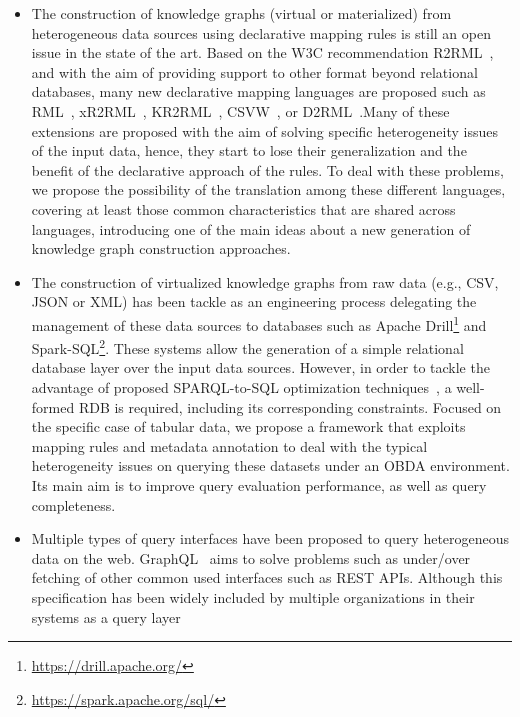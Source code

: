 \begin{itemize}
    \item The construction of knowledge graphs (virtual or materialized) from heterogeneous data sources using declarative mapping rules is still an open issue in the state of the art. Based on the W3C recommendation R2RML~\citep{R2RML}, and with the aim of providing support to other format beyond relational databases, many new declarative mapping languages are proposed such as RML~\citep{dimou2014rml}, xR2RML~\citep{michel2015translation}, KR2RML~\citep{slepicka2015kr2rml}, CSVW~\citep{tennison2015model}, or D2RML~\citep{chortaras2018mapping}.Many of these extensions are proposed with the aim of solving specific heterogeneity issues of the input data, hence, they start to lose their generalization and the benefit of the declarative approach of the rules. To deal with these problems, we propose the possibility of the translation among these different languages, covering at least those common characteristics that are shared across languages, introducing one of the main ideas about a new generation of knowledge graph construction approaches.
    \item The construction of virtualized knowledge graphs from raw data (e.g., CSV, JSON or XML) has been tackle as an engineering process delegating the management of these data sources to databases such as Apache Drill\footnote{\url{https://drill.apache.org/}} and Spark-SQL\footnote{\url{https://spark.apache.org/sql/}}. These systems allow the generation of a simple relational database layer over the input data sources. However, in order to tackle the advantage of proposed SPARQL-to-SQL optimization techniques~\citep{priyatna2014formalisation,calvanese2017ontop}, a well-formed RDB is required, including its corresponding constraints. Focused on the specific case of tabular data, we propose a framework that exploits mapping rules and metadata annotation to deal with the typical heterogeneity issues on querying these datasets under an OBDA environment. Its main aim is to improve query evaluation performance, as well as query completeness.
    \item Multiple types of query interfaces have been proposed to query heterogeneous data on the web. GraphQL~\citep{graphql} aims to solve problems such as under/over fetching of other common used interfaces such as REST APIs. Although this specification has been widely included by multiple organizations in their systems as a query layer
    \end{itemize}


